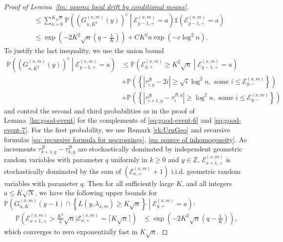 \documentclass[EJP]{ejpecp} %
\begin{document}
\begin{proof}[Proof of Lemma~\ref{lm: approx local drift by conditional means}]
\begin{align*}
		&\le \sum_{a = 0}^{K \sqrt{n}} \mathbb{P}\left( \left( G_{n, K^2}^{(x,m)}(y) \right) ^c \middle| \mathcal{E}_{y-1, +}^{(x,m)} = a \right) \mathbb{1}\left( \mathcal{E}_{y-1, +}^{(x,m)} = a \right) \\
		&\le \exp\left( - 2 K^2 \sqrt{n} (q - \frac{1}{K}) \right) + C K^2 n \exp\left(- c \log^2 n\right)
		.
	\end{align*}
	To justify the last inequality,
	we use the union bound
	\begin{align*}
	\mathbb{P}\left( \left( G_{n, K^2}^{(x,m)}(y) \right) ^c \middle| \mathcal{E}_{y-1, +}^{(x,m)} 
	= a \right)
	&\le \mathbb{P}\left( \mathcal{E}_{y, +}^{(x,m)} \ge K^2 \sqrt{n} \middle| \mathcal{E}_{y-1, +}^{(x,m)} = a \right) \\
	&+ \mathbb{P}\left( \left\{\left|\tau_{i, y}^{\mathscr{B}}-2 i\right|\ge\sqrt{i} \log ^2 n, \text { some } i \leq \mathcal{E}_{y,-}^{(x, m)}\right\} \right) \\
	&+ \mathbb{P}\left( \left\{\left|\tau_{i+1, y}^{\mathscr{B}}-\tau_i^{\mathscr{B}, y}\right|\ge\log ^2 n, \text { some } i \leq \mathcal{E}_{y,-}^{(x, m)}\right\} \right)
	\end{align*}
	and control the second and third probabilities as in the proof of Lemma~\ref{lm:good-event} for the complements of \eqref{eq:good-event-6} and \eqref{eq:good-event-7}. For the first probability,
	we use Remark \ref{rk:UrnGeo} and recursive formulas \eqref{eq: recursive formula for upcrossings}, \eqref{eq: source of inhomogeneity}. As increments $\tau^{\mathscr{B}}_{k+1,y} -\tau^{\mathscr{B}}_{k,y}$ are stochastically dominated by independent geometric random variables with parameter $q$ uniformly in $ k \geq 0$ and $y \in \mathbb{Z}$, $\mathcal{E}_{x+1,+}^{(x,m)}$ is stochastically dominated by the sum of $ (\mathcal{E}_{x,+}^{(x,m)} +1) $ i.i.d. geometric random variables with parameter $q$. Then for all sufficiently large $K$, and all integers $a\leq K\sqrt{N}$, we have the following upper bounds for $\mathbb{P}\left( G_{n, K}^{(x,m)}(y-1)\cap \left\{L(y, \lambda_{x, m}) \ge K \sqrt{n}\right\} \middle| \mathcal{E}_{y, +}^{(x,m)}=a \right)$:
	\begin{align*}
		\mathbb{P}\left(\mathcal{E}_{x+1,+}^{(x,m)} > \frac{K^2}{2} \sqrt{n} | \mathcal{E}_{x,+}^{(x, m)} = \lceil K \sqrt{n} \rceil\right)
		&\le \exp\left( - 2 K^2 \sqrt{n}(q - \frac{1}{K})  \right) 
		,
	\end{align*}
	which converges to zero exponentially fast in $K \sqrt{n}$. 
	

\end{proof}
\end{document}
